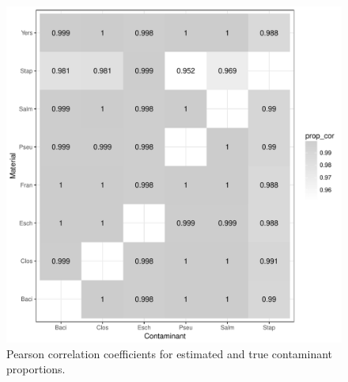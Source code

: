 \documentclass[fleqn,10pt,lineno]{wlpeerj}\usepackage[]{graphicx}\usepackage[]{color}
\makeatletter
\def\maxwidth{ %
  \ifdim\Gin@nat@width>\linewidth
    \linewidth
  \else
    \Gin@nat@width
  \fi
}
\newenvironment{knitrout}{}{} %
\makeatother
\begin{document}
\begin{knitrout}
\color{fgcolor}\begin{figure}
\includegraphics[width=\maxwidth]{figure/contam_corr-1.pdf} \caption[Pearson correlation coefficients for estimated and true contaminant proportions]{Pearson correlation coefficients for estimated and true contaminant proportions.}\label{fig:contam_corr}
\end{figure}


\end{knitrout}
\end{document}
